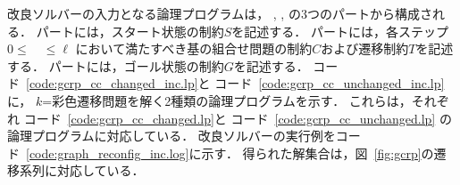 





改良ソルバーの入力となる論理プログラムは，
, , 
の3つのパートから構成される．
 パートには，スタート状態の制約$S$を記述する．
 パートには，各ステップ$0\leq$~~$\leq \ell$
において満たすべき基の組合せ問題の制約$C$および遷移制約$T$を記述する．
 パートには，ゴール状態の制約$G$を記述する．
%
コード~\ref{code:gcrp_cc_changed_inc.lp}と
コード~\ref{code:gcrp_cc_unchanged_inc.lp}に，
$k$=彩色遷移問題を解く2種類の論理プログラムを示す．
これらは，それぞれ
コード~\ref{code:gcrp_cc_changed.lp}と
コード~\ref{code:gcrp_cc_unchanged.lp}
の論理プログラムに対応している．
改良ソルバーの実行例をコード~\ref{code:graph_reconfig_inc.log}に示す．
得られた解集合は，図~\ref{fig:gcrp}の遷移系列に対応している．

